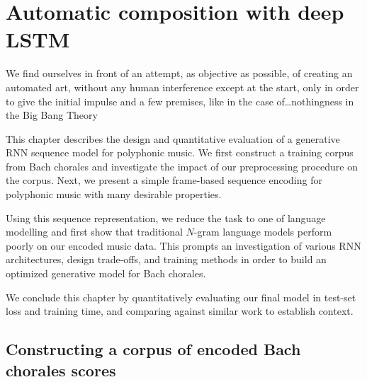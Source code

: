 \chapter{Automatic composition with deep LSTM}\label{ch:automatic-composition}
\begin{savequote}[75mm]
  We find ourselves in front of an attempt, as objective as possible, of creating
  an automated art, without any human interference except at the start, only in
  order to give the initial impulse and a few premises, like in the case
  of\ldots nothingness in the Big Bang Theory
\end{savequote}
\ifpdf
    \graphicspath{{Chapter4/Figs/Raster/}{Chapter4/Figs/PDF/}{Chapter4/Figs/}}
\else
    \graphicspath{{Chapter4/Figs/Vector/}{Chapter4/Figs/}}
\fi

This chapter describes the design and quantitative evaluation of a generative
RNN sequence model for polyphonic music. We first construct a training corpus
from Bach chorales and investigate the impact of our preprocessing procedure on
the corpus. Next, we present a simple frame-based sequence encoding for
polyphonic music with many desirable properties.

Using this sequence representation, we reduce the task to one of language
modelling and first show that traditional $N$-gram language models perform poorly
on our encoded music data. This prompts an investigation of various RNN
architectures, design trade-offs, and training methods in order to build
an optimized generative model for Bach chorales.

We conclude this chapter by quantitatively evaluating our final model in
test-set loss and training time, and comparing against similar work to
establish context.

\section{Constructing a corpus of encoded Bach chorales scores}


